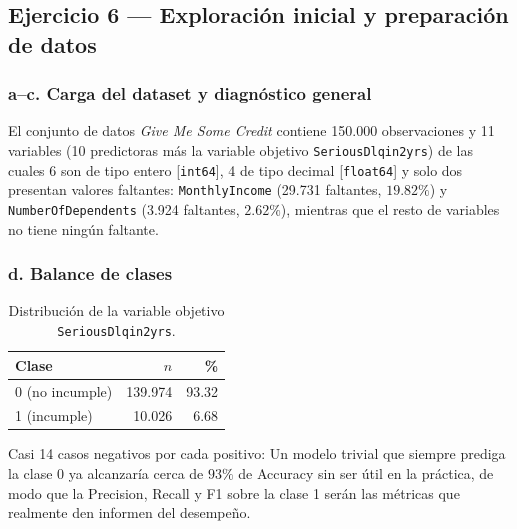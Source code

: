 \subsection{Ejercicio 6 --- Exploración inicial y preparación de datos}

\subsubsection*{a--c. Carga del dataset y diagnóstico general}

El conjunto de datos \emph{Give Me Some Credit} contiene 150.000
observaciones y 11 variables (10 predictoras más la variable objetivo
\texttt{SeriousDlqin2yrs}) de las cuales 6 son de tipo entero
[\texttt{int64}], 4 de tipo decimal [\texttt{float64}] y solo dos
presentan valores faltantes: \texttt{MonthlyIncome} (29.731 faltantes,
$19.82\%$) y \texttt{NumberOfDependents} (3.924 faltantes, $2.62\%$),
mientras que el resto de variables no tiene ningún faltante.

\subsubsection*{d. Balance de clases}

\begin{table}[H]
\centering
\begin{tabular}{lrr}
\toprule
Clase & $n$ & \% \\
\midrule
0 (no incumple) & 139.974 & 93.32 \\
1 (incumple)     &  10.026 &  6.68 \\
\bottomrule
\end{tabular}
\caption{Distribución de la variable objetivo \texttt{SeriousDlqin2yrs}.}
\end{table}

Casi 14 casos negativos por cada positivo: Un modelo trivial que
siempre prediga la clase 0 ya alcanzaría cerca de $93\%$ de Accuracy
sin ser útil en la práctica, de modo que la Precision, Recall y F1 sobre
la clase 1 serán las métricas que realmente den informen del desempeño.

